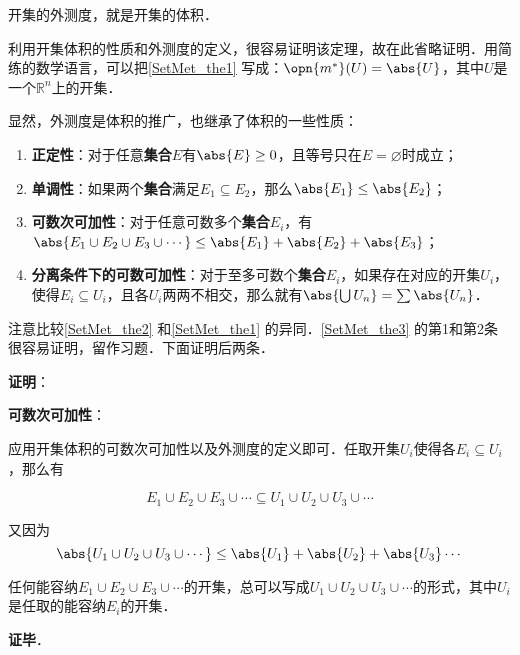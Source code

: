 \begin{theorem}{}\label{SetMet_the1}
开集的外测度，就是开集的体积．
\end{theorem}

利用开集体积的性质和外测度的定义，很容易证明该定理，故在此省略证明．用简练的数学语言，可以把\autoref{SetMet_the1} 写成：$\opn{m^*}(U)=\abs{U}$，其中$U$是一个$\mathbb{R}^n$上的开集．

显然，外测度是体积的推广，也继承了体积的一些性质：

\begin{theorem}{}\label{SetMet_the3}
\begin{enumerate}
\item \textbf{正定性}：对于任意\textbf{集合}$E$有$\abs{E}\geq 0$，且等号只在$E=\varnothing$时成立；\\
\item \textbf{单调性}：如果两个\textbf{集合}满足$E_1\subseteq E_2$，那么$\abs{E_1}\leq \abs{E_2}$；\\
\item \textbf{可数次可加性}：对于任意可数多个\textbf{集合}$E_i$，有$\abs{E_1\cup E_2\cup E_3\cup \cdots}\leq \abs{E_1}+\abs{E_2}+\abs{E_3}$；\\
\item \textbf{分离条件下的可数可加性}：对于至多可数个\textbf{集合}$E_i$，如果存在对应的开集$U_i$，使得$E_i\subseteq U_i$，且各$U_i$两两不相交，那么就有$\abs{\bigcup U_n}=\sum\abs{U_n}$．
\end{enumerate}
\end{theorem}

注意比较\autoref{SetMet_the2} 和\autoref{SetMet_the1} 的异同．\autoref{SetMet_the3} 的第1和第2条很容易证明，留作习题．下面证明后两条．

\textbf{证明}：

\textbf{可数次可加性}：

应用开集体积的可数次可加性以及外测度的定义即可．任取开集$U_i$使得各$E_i\subseteq U_i$，那么有

\begin{equation}
E_1\cup E_2\cup E_3\cup \cdots \subseteq U_1\cup U_2\cup U_3\cup \cdots
\end{equation}

又因为
\begin{equation}
\abs{U_1\cup U_2\cup U_3\cup \cdots} \leq \abs{U_1}+\abs{U_2}+\abs{U_3}\cdots
\end{equation}

任何能容纳$E_1\cup E_2\cup E_3\cup \cdots $的开集，总可以写成$U_1\cup U_2\cup U_3\cup \cdots$的形式，其中$U_i$是任取的能容纳$E_i$的开集．

\textbf{证毕}．




















